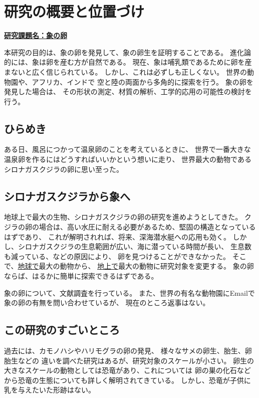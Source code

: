 \documentclass[11pt,a4paper,uplatex,dvipdfmx]{ujarticle} 		%
\newcommand{\研究課題名}{象の卵}
\newcommand{\研究機関名}{逢坂大学}
\newcommand{\研究代表者氏名}{湯川秀樹}
\begin{document}

\section{研究の概要と位置づけ}

\noindent
\underline{\textbf{研究課題名：\研究課題名}}

本研究の目的は、象の卵を発見して、象の卵生を証明することである。
進化論的には、象は卵を産む方が自然である。
	現在、象は哺乳類であるために卵を産まないと広く信じられている。
	しかし、これは必ずしも正しくない。
	世界の動物園や、アフリカ、インドで
	空と陸の両面から多角的に探索を行う。
	象の卵を発見した場合は、
	その形状の測定、材質の解析、工学的応用の可能性の検討を行う。

\subsection{ひらめき}
ある日、風呂につかって温泉卵のことを考えているときに、
世界で一番大きな温泉卵を作るにはどうすればいいかという想いに走り、
世界最大の動物であるシロナガスクジラの卵に思い至った。

\subsection{シロナガスクジラから象へ}
\label{sec:whale}
地球上で最大の生物、シロナガスクジラの卵の研究を進めようとしてきた。
クジラの卵の場合は、高い水圧に耐える必要があるため、堅固の構造となっているはずであり、
これが解明されれば、将来、深海潜水艇への応用も効く。
しかし、シロナガスクジラの生息範囲が広い、海に潜っている時間が長い、
生息数も減っている、などの原因により、
卵を見つけることができなかった。
そこで、\underline{地球で}最大の動物から、
\underline{地上で}最大の動物に研究対象を変更する。
象の卵ならば、はるかに簡単に探索できるはずである。

	象の卵について、文献調査を行っている。
	また、世界の有名な動物園にEmailで象の卵の有無を問い合わせているが、
	現在のところ返事はない。

\subsection{この研究のすごいところ}
	過去には、カモノハシやハリモグラの卵の発見、
	様々なサメの卵生、胎生、卵胎生などの
	違いを調べた研究はあるが、研究対象のスケールが小さい。
	卵生の大きなスケールの動物としては恐竜があり、これについては
	卵の巣の化石などから恐竜の生態についても詳しく解明されてきている。
	しかし、恐竜が子供に乳を与えたいた形跡はない。
	
\end{document}
